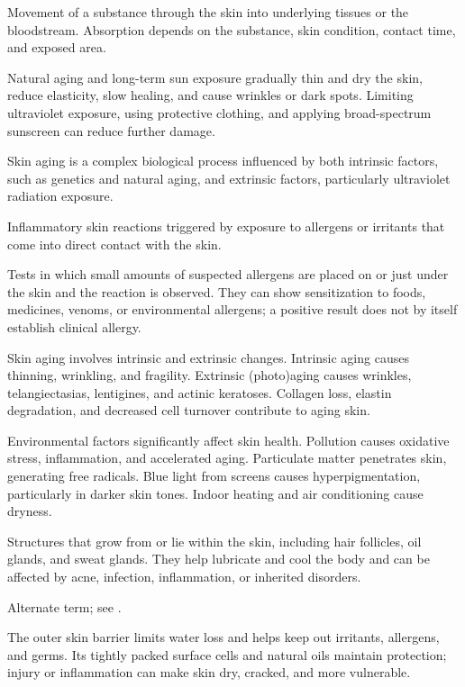  Movement of a substance through the skin into underlying tissues or the bloodstream. Absorption depends
on the substance, skin condition, contact time, and exposed area.

 Natural aging and long-term sun exposure gradually thin and dry the skin, reduce elasticity, slow healing, and cause wrinkles or dark spots. Limiting ultraviolet exposure, using protective clothing, and applying broad-spectrum sunscreen can reduce further damage.

 Skin aging is a complex biological process influenced by both intrinsic factors, such as
genetics and natural aging, and extrinsic factors, particularly ultraviolet radiation
exposure.

 Inflammatory skin reactions triggered by exposure to allergens or irritants that come
into direct contact with the skin.

 Tests in which small amounts of suspected allergens are placed on or just under the skin and the reaction is observed. They can show sensitization to foods, medicines, venoms, or environmental allergens; a positive result does not by itself establish clinical allergy.

 Skin aging involves intrinsic and extrinsic changes. Intrinsic aging causes thinning,
wrinkling, and fragility. Extrinsic (photo)aging causes wrinkles, telangiectasias,
lentigines, and actinic keratoses. Collagen loss, elastin degradation, and decreased
cell turnover contribute to aging skin.

 Environmental factors significantly affect skin health. Pollution causes oxidative
stress, inflammation, and accelerated aging. Particulate matter penetrates skin,
generating free radicals. Blue light from screens causes hyperpigmentation, particularly
in darker skin tones. Indoor heating and air conditioning cause dryness.

 Structures that grow from or lie within the skin, including hair follicles, oil glands, and sweat glands. They help lubricate and cool the body and can be affected by acne, infection, inflammation, or inherited disorders.

 Alternate term; see .

 The outer skin barrier limits water loss and helps keep out irritants, allergens, and germs. Its tightly packed surface cells and natural oils maintain protection; injury or inflammation can make skin dry, cracked, and more vulnerable.

